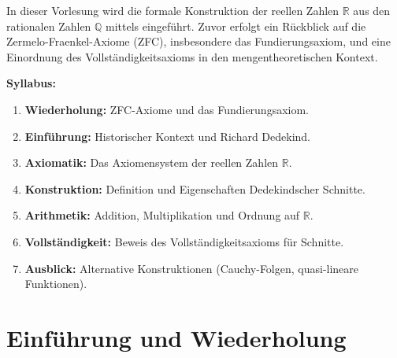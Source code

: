 


\begin{nice-box}
In dieser Vorlesung wird die formale Konstruktion der reellen Zahlen $\mathbb{R}$ aus den rationalen Zahlen $\mathbb{Q}$ mittels  eingeführt. Zuvor erfolgt ein Rückblick auf die Zermelo-Fraenkel-Axiome (ZFC), insbesondere das Fundierungsaxiom, und eine Einordnung des Vollständigkeitsaxioms in den mengentheoretischen Kontext.

\textbf{Syllabus:}
\begin{enumerate}[label=\textbf{(\arabic*)}]
    \item \textbf{Wiederholung:} ZFC-Axiome und das Fundierungsaxiom.
    \item \textbf{Einführung:} Historischer Kontext und Richard Dedekind.
    \item \textbf{Axiomatik:} Das Axiomensystem der reellen Zahlen $\mathbb{R}$.
    \item \textbf{Konstruktion:} Definition und Eigenschaften Dedekindscher Schnitte.
    \item \textbf{Arithmetik:} Addition, Multiplikation und Ordnung auf $\mathbb{R}$.
    \item \textbf{Vollständigkeit:} Beweis des Vollständigkeitsaxioms für Schnitte.
    \item \textbf{Ausblick:} Alternative Konstruktionen (Cauchy-Folgen, quasi-lineare Funktionen).
\end{enumerate}
\end{nice-box}

\section{Einführung und Wiederholung}

